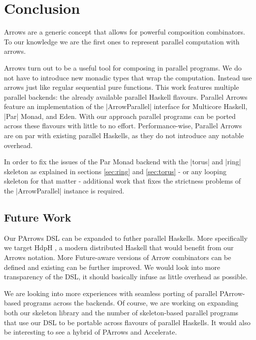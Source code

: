 
\section{Conclusion}
\label{sec:conclusion}
Arrows are a generic concept that allows for powerful composition combinators. To our knowledge we are the first ones to represent parallel computation with arrows. \done

Arrows turn out to be a useful tool for composing in parallel programs. We do not have to introduce new monadic types that wrap the computation. Instead use arrows just like regular sequential pure functions. 
%
This work features multiple parallel backends: the already available parallel Haskell flavours. Parallel Arrows feature an implementation of the |ArrowParallel| interface for Multicore Haskell, |Par| Monad, and Eden. With our approach parallel programs can be ported across these flavours with little to no effort.
%
%
Performance-wise, Parallel Arrows are on par with existing parallel Haskells, as they do not introduce any notable overhead.

In order to fix the issues of the Par Monad backend with the |torus| and |ring| skeleton as explained in sections \ref{sec:ring} and \ref{sec:torus} - or any looping skeleton for that matter - additional work that fixes the strictness problems of the |ArrowParallel| instance is required.


\subsection{Future Work}
\label{sec:future-work}

Our PArrows DSL can be expanded to futher parallel Haskells. More specifically we target HdpH \cite{Maier:2014:HDS:2775050.2633363}, a modern distributed Haskell that would benefit from our Arrows notation. More Future-aware versions of Arrow combinators can be defined and existing can be further improved. We would look into more transparency of the DSL, it should basically infuse as little overhead as possible.

We are looking into more experiences with seamless porting of parallel PArrow-based programs across the backends.
Of course, we are working on expanding both our skeleton library and the number of skeleton-based parallel programs that use our DSL to be portable across flavours of parallel Haskells.
It would also be interesting to see a hybrid of PArrows and Accelerate.
